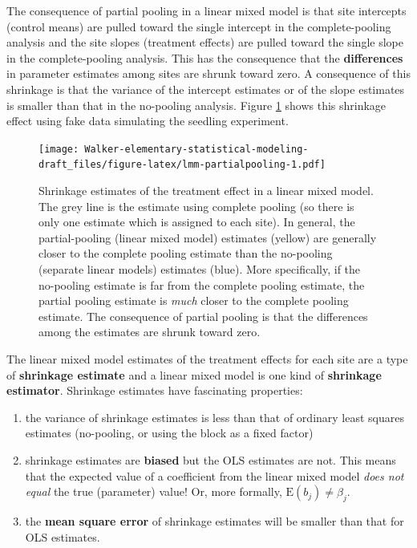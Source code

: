 \documentclass[]{book}
\providecommand{\tightlist}{%
  \setlength{\itemsep}{0pt}\setlength{\parskip}{0pt}}
\begin{document}
The consequence of partial pooling in a linear mixed model is that site intercepts (control means) are pulled toward the single intercept in the complete-pooling analysis and the site slopes (treatment effects) are pulled toward the single slope in the complete-pooling analysis. This has the consequence that the \textbf{differences} in parameter estimates among sites are shrunk toward zero. A consequence of this shrinkage is that the variance of the intercept estimates or of the slope estimates is smaller than that in the no-pooling analysis. Figure \ref{fig:lmm-partialpooling} shows this shrinkage effect using fake data simulating the seedling experiment.

\begin{figure}
\centering
\texttt{[image: Walker-elementary-statistical-modeling-draft\_files/figure-latex/lmm-partialpooling-1.pdf]}
\caption{\label{fig:lmm-partialpooling}Shrinkage estimates of the treatment effect in a linear mixed model. The grey line is the estimate using complete pooling (so there is only one estimate which is assigned to each site). In general, the partial-pooling (linear mixed model) estimates (yellow) are generally closer to the complete pooling estimate than the no-pooling (separate linear models) estimates (blue). More specifically, if the no-pooling estimate is far from the complete pooling estimate, the partial pooling estimate is \emph{much} closer to the complete pooling estimate. The consequence of partial pooling is that the differences among the estimates are shrunk toward zero.}
\end{figure}

The linear mixed model estimates of the treatment effects for each site are a type of \textbf{shrinkage estimate} and a linear mixed model is one kind of \textbf{shrinkage estimator}. Shrinkage estimates have fascinating properties:

\begin{enumerate}
\def\labelenumi{\arabic{enumi}.}
\tightlist
\item
  the variance of shrinkage estimates is less than that of ordinary least squares estimates (no-pooling, or using the block as a fixed factor)
\item
  shrinkage estimates are \textbf{biased} but the OLS estimates are not. This means that the expected value of a coefficient from the linear mixed model \emph{does not equal} the true (parameter) value! Or, more formally, \(\mathrm{E}(b_j) \ne \beta_j\).
\item
  the \textbf{mean square error} of shrinkage estimates will be smaller than that for OLS estimates.
\end{enumerate}
\end{document}
